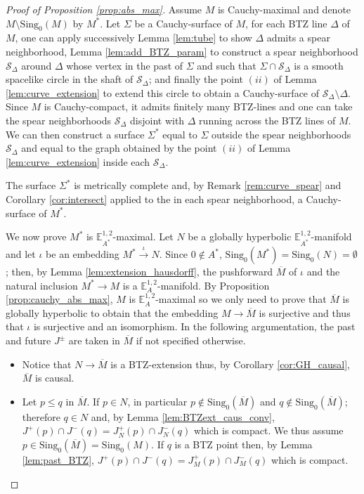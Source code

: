 \documentclass[a4paper,12pt]{article}
\def\sing{\mathrm{Sing}}
\newcommand{\mass}[1]{{\mathbb E}^{1,2}_{#1}}
\begin{document}
\begin{proof}[Proof of Proposition \ref{prop:abs_max}]
 Assume $M$ is Cauchy-maximal and denote $M\setminus \sing_0(M)$ by $M^*$.
 Let $\Sigma$ be a Cauchy-surface of $M$, for each BTZ line $\Delta$ of $M$, one can apply successively Lemma \ref{lem:tube} to show $\Delta$ admits a spear neighborhood, Lemma \ref{lem:add_BTZ_param} to construct a spear neighborhood $\mathcal S_\Delta$ around $\Delta$ whose vertex in the past of $\Sigma$ and such that $\Sigma\cap \mathcal S_\Delta$ is a  smooth spacelike circle in the shaft of $\mathcal S_\Delta$; and finally the point  $(ii)$ of Lemma \ref{lem:curve_extension} to extend this circle to obtain a Cauchy-surface of $\mathcal S_\Delta \setminus \Delta$.   
 Since $M$ is Cauchy-compact, it admits finitely many BTZ-lines and one can take the spear neighborhoods $\mathcal S_\Delta$ disjoint with $\Delta$ running across the BTZ lines of $M$. We can then construct a surface $\Sigma^*$ equal to $\Sigma$ outside the spear neighborhoods $\mathcal S_\Delta$ and equal to the graph obtained by the point $(ii)$ of Lemma \ref{lem:curve_extension} inside each $\mathcal S_\Delta$. 

  The surface $\Sigma^*$ is metrically complete and, by Remark \ref{rem:curve_spear} and Corollary \ref{cor:intersect} applied to the in each spear neighborhood, a Cauchy-surface of $M^*$. 

  We now prove $M^*$ is $\mass{A^*}$-maximal. Let $N$ be a globally hyperbolic $\mass{A^*}$-manifold and let $\iota$ be an embedding $M^*\xrightarrow{~\iota~} N$.  Since $0\notin A^*$, $\sing_0(M^*)=\sing_0(N)=\emptyset$; then, by Lemma \ref{lem:extension_hausdorff}, the pushforward $\overline M$ of $\iota$ and the natural inclusion $M^*\rightarrow M$ is a $\mass{A}$-manifold.  By Proposition \ref{prop:cauchy_abs_max}, $M$ is $\mass{A}$-maximal so  we only need to prove that $\overline M$ is globally hyperbolic to obtain that the embedding $M\rightarrow \overline M$ is surjective and thus that $\iota$ is surjective and an isomorphism. In the following argumentation, the past and future $J^\pm$ are taken in $\overline M$ if not specified otherwise.

 
 \begin{itemize}
  \item Notice that $N\rightarrow \overline M$ is a BTZ-extension thus, by Corollary \ref{cor:GH_causal}, $\overline M$ is causal. 
  \item Let $p\leq q$ in $\overline M$. If $p\in N$, in particular $p\notin \sing_0(\overline M)$ and $q\notin \sing_0(\overline M)$; therefore $q\in N$ and, by Lemma \ref{lem:BTZext_caus_conv},
$J^+(p)\cap J^-(q) = J^+_N(p) \cap J^-_N(q)$ which is compact. 
We thus assume $p\in \sing_0(\overline M)=\sing_0(M)$. If $q$ is a BTZ point then, by Lemma \ref{lem:past_BTZ}, $J^+(p)\cap J^-(q) = J^+_M(p) \cap J^-_M(q)$ which is compact.


\end{itemize}
\end{proof}
\end{document}
